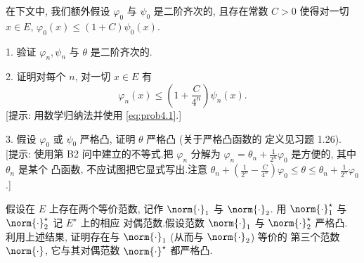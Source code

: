 \begin{problem}
在下文中, 我们额外假设 $\varphi_0$ 与 $\psi_0$ 是二阶齐次的, 且存在常数
$C>0$ 使得对一切 $x\in E$, $\varphi_0(x)\le(1+C)\psi_0(x)$.

1. 验证 $\varphi_n,\psi_n$ 与 $\theta$ 是二阶齐次的.

2. 证明对每个 $n$, 对一切 $x\in E$ 有
\begin{equation*}
\varphi_n(x)\le\left(1+\frac{C}{4^n}\right)\psi_n(x).
\end{equation*}
[提示: 用数学归纳法并使用 \eqref{eq:prob4.1}.]

3. 假设 $\varphi_0$ 或 $\psi_0$ 严格凸, 证明 $\theta$ 严格凸 (关于严格凸函数的
定义见习题 1.26).\\
{[提示: 使用第 B2 问中建立的不等式.把 $\varphi_n$ 分解为
$\varphi_n=\theta_n+\frac{1}{2^n}\varphi_0$ 是方便的, 其中 $\theta_n$ 是某个
凸函数, 不应试图把它显式写出.注意
$\theta_n+\left(\frac{1}{2^n}-\frac{C}{4^n}\right)\varphi_0\le\theta\le\theta_n+\frac{1}{2^n}\varphi_0$.]}


假设在 $E$ 上存在两个等价范数, 记作 $\norm{\cdot}_1$ 与 $\norm{\cdot}_2$.
用 $\norm{\cdot}_1^\star$ 与 $\norm{\cdot}_2^\star$ 记 $E^\star$ 上的相应
对偶范数.假设范数 $\norm{\cdot}_1$ 与 $\norm{\cdot}_2^\star$ 严格凸.
利用上述结果, 证明存在与 $\norm{\cdot}_1$ (从而与 $\norm{\cdot}_2$) 等价的
第三个范数 $\norm{\cdot}$, 它与其对偶范数 $\norm{\cdot}^\star$ 都严格凸.
\end{problem}

